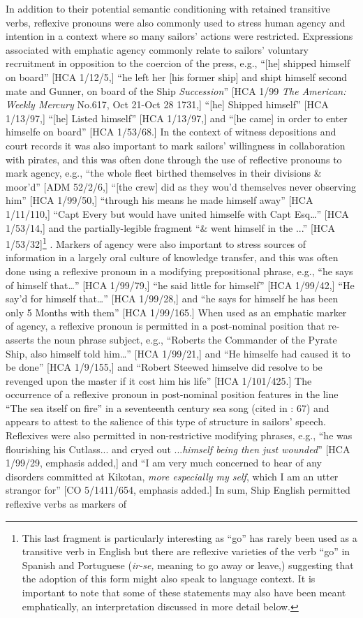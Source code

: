   In addition to their potential semantic conditioning with retained transitive verbs, reflexive pronouns were also commonly used to stress human agency and intention in a context where so many sailors’ actions were restricted. Expressions associated with emphatic agency commonly relate to sailors’ voluntary recruitment in opposition to the coercion of the press, e.g., “[he] shipped himself on board” [HCA 1/12/5,] “he left her [his former ship] and shipt himself second mate and Gunner, on board of the Ship \textit{Succession}” [HCA 1/99 \textit{The American: Weekly Mercury} No.617, Oct 21-Oct 28 1731,] “[he] Shipped himself” [HCA 1/13/97,] “[he] Listed himself” [HCA 1/13/97,] and “[he came] in order to enter himselfe on board” [HCA 1/53/68.] In the context of witness depositions and court records it was also important to mark sailors’ willingness in collaboration with pirates, and this was often done through the use of reflective pronouns to mark agency, e.g., “the whole fleet birthed themselves in their divisions \& moor’d” [ADM 52/2/6,] “[the crew] did as they wou’d themselves never observing him” [HCA 1/99/50,] “through his means he made himself away” [HCA 1/11/110,] “Capt Every but would have united himselfe with Capt Esq…” [HCA 1/53/14,] and the partially-legible fragment “\& went himself in the ...” [HCA 1/53/32]\footnote{This last fragment is particularly interesting as “go” has rarely been used as a transitive verb in English but there are reflexive varieties of the verb “go” in Spanish and Portuguese (\textit{ir-se,} meaning to go away or leave,) suggesting that the adoption of this form might also speak to language context. It is important to note that some of these statements may also have been meant emphatically, an interpretation discussed in more detail below.} . Markers of agency were also important to stress sources of information in a largely oral culture of knowledge transfer, and this was often done using a reflexive pronoun in a modifying prepositional phrase, e.g., “he says of himself that…” [HCA 1/99/79,] “he said little for himself” [HCA 1/99/42,] “He say’d for himself that…” [HCA 1/99/28,] and “he says for himself he has been only 5 Months with them” [HCA 1/99/165.] When used as an emphatic marker of agency, a reflexive pronoun is permitted in a post-nominal position that re-asserts the noun phrase subject, e.g., “Roberts the Commander of the Pyrate Ship, also himself told him…” [HCA 1/99/21,] and “He himselfe had caused it to be done” [HCA 1/9/155,] and “Robert Steewed himselve did resolve to be revenged upon the master if it cost him his life” [HCA 1/101/425.] The occurrence of a reflexive pronoun in post-nominal position features in the line “The sea itself on fire” in a seventeenth century sea song (cited in \citealt{Palmer1986}: 67) and appears to attest to the salience of this type of structure in sailors’ speech. Reflexives were also permitted in non-restrictive modifying phrases, e.g., “he was flourishing his Cutlass... and cryed out ...\textit{himself being then just wounded}” [HCA 1/99/29, emphasis added,] and “I am very much concerned to hear of any disorders committed at Kikotan, \textit{more especially my self}, which I am an utter strangor for” [CO 5/1411/654, emphasis added.] In sum, Ship English permitted reflexive verbs as markers of 